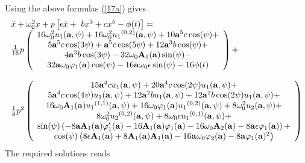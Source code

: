 \documentclass{ws-ijbc}
\begin{document}
\noindent Using the above formulas (\ref{17a}) gives \ 
\begin{equation}
\begin{tabular}{l}
$\ddot{x}+\omega _{0}^{2}x+p\left[ \epsilon \dot{x}+~bx^{3}+cx^{5}-\phi (t)%
\right] =$ \\ 
$\frac{1}{16}p\left( 
\begin{array}{c}
16\omega _{0}^{2}u_{1}(\mathbf{a},\psi )+16\omega _{0}^{2}u_{1}{}^{(0,2)}(%
\mathbf{a},\psi )+10\mathbf{a}^{5}c\cos (\psi )+ \\ 
5\mathbf{a}^{5}c\cos (3\psi )+\mathbf{a}^{5}c\cos (5\psi )+12\mathbf{a}%
^{3}b\cos (\psi )+ \\ 
4\mathbf{a}^{3}b\cos (3\psi )-32\omega _{0}\mathbf{A}_{1}(\mathbf{a})\sin
(\psi )- \\ 
32\mathbf{a}\omega _{0}\varphi _{1}(\mathbf{a})\cos (\psi )-16\mathbf{a}%
\omega _{0}\epsilon \sin (\psi )-16\phi (t)%
\end{array}%
\right) +$ \\ 
\\ 
$\frac{1}{8}p^{2}\left( 
\begin{array}{c}
15\mathbf{a}^{4}cu_{1}(\mathbf{a},\psi )+20\mathbf{a}^{4}c\cos (2\psi )u_{1}(%
\mathbf{a},\psi )+ \\ 
5\mathbf{a}^{4}c\cos (4\psi )u_{1}(\mathbf{a},\psi )+12\mathbf{a}^{2}bu_{1}(%
\mathbf{a},\psi )+12\mathbf{a}^{2}b\cos (2\psi )u_{1}(\mathbf{a},\psi )+ \\ 
16\omega _{0}\mathbf{A}_{1}(\mathbf{a})u_{1}{}^{(1,1)}(\mathbf{a},\psi
)+16\omega _{0}\varphi _{1}(\mathbf{a})u_{1}{}^{(0,2)}(\mathbf{a},\psi
)+8\omega _{0}^{2}u_{2}(\mathbf{a},\psi )+ \\ 
8\omega _{0}^{2}u_{2}{}^{(0,2)}(\mathbf{a},\psi )+8\omega _{0}\epsilon
u_{1}{}^{(0,1)}(\mathbf{a},\psi )+ \\ 
\sin (\psi )\left( -8\mathbf{aA}_{1}(\mathbf{a})\varphi _{1}^{\prime }(%
\mathbf{a})-16\mathbf{A}_{1}(\mathbf{a})\varphi _{1}(\mathbf{a})-16\omega
_{0}\mathbf{A}_{2}(\mathbf{a})-8\mathbf{a}\epsilon \varphi _{1}(\mathbf{a}%
)\right) + \\ 
\cos (\psi )\left( 8\epsilon \mathbf{A}_{1}(\mathbf{a})+8\mathbf{A}_{1}(%
\mathbf{a})\mathbf{A}_{1}(\mathbf{a})-16\mathbf{a}\omega _{0}\varphi _{2}(%
\mathbf{a})-8\mathbf{a}\varphi _{1}(\mathbf{a}){}^{2}\right)%
\end{array}%
\right) $%
\end{tabular}
\label{kbm4}
\end{equation}%
The required solutions reads%
\end{document}
